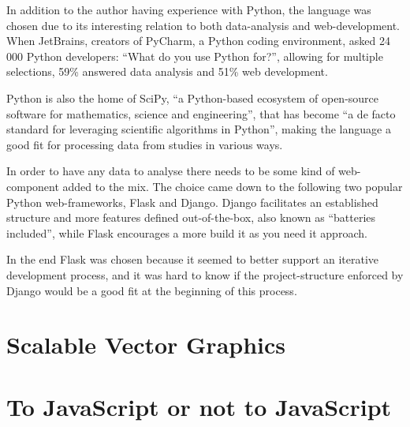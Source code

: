   In addition to the author having experience with Python, the language was
  chosen due to its interesting relation to both data-analysis and
  web-development. When
  JetBrains\cite{citeJetBrains},
  creators of
  PyCharm\cite{citePyCharm},
  a Python coding environment, asked 24 000 Python
  developers:
  ``What do you use Python for?''\cite{citeJetSurvey}, allowing for multiple
  selections, 59\% answered data analysis and 51\% web development.

  Python is also the home of SciPy, ``a Python-based ecosystem of open-source
  software for mathematics, science and engineering''\cite{citeSciPyHomepage},
  that has become ``a de facto
  standard for leveraging scientific algorithms in
  Python''\cite{citeSciPyPaper}, making the language a good fit for processing
  data from studies in various ways.

  In order to have any data to analyse there needs to be some kind of
  web-component added to the mix. The choice came down to the following two
  popular Python web-frameworks, Flask\cite{citeFlaskHomepage} and
  Django\cite{citeDjangoHomepage}. Django facilitates an established structure
  and more features defined out-of-the-box, also known as ``batteries
  included'', while Flask encourages a more build it as you need it approach.

  In the end Flask was chosen because it seemed to better support an iterative
  development process, and it was hard to know if the project-structure enforced
  by Django would be a good fit at the beginning of this process.


%
%

\cite{citeBeyondTheUsabilityLab}
\cite{citeBenefitsRemote}
\cite{citeBottomLine}
\cite{citeImpactSoftwareDesign}
\cite{citeKeyPrinciplesUserCentric}

\section{Scalable Vector Graphics}

\section{To JavaScript or not to JavaScript}

